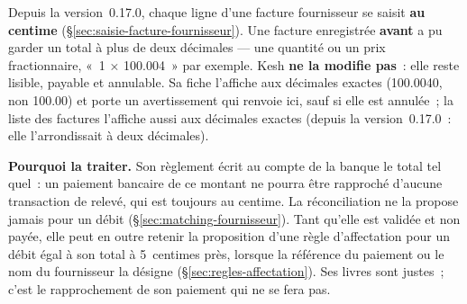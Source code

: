 \documentclass[a4paper,11pt,oneside]{article}
\begin{document}
Depuis la version~0.17.0, chaque ligne d'une facture fournisseur se saisit \textbf{au centime}
(\S\ref{sec:saisie-facture-fournisseur}). Une facture enregistrée \textbf{avant} a pu garder un
total à plus de deux décimales --- une quantité ou un prix fractionnaire, «~1 × 100.004~» par
exemple. Kesh \textbf{ne la modifie pas}~: elle reste lisible, payable et annulable. Sa fiche
l'affiche aux décimales exactes (100.0040, non 100.00) et porte un avertissement qui renvoie
ici, sauf si elle est annulée~; la liste des factures l'affiche aussi aux décimales exactes
(depuis la version~0.17.0~: elle l'arrondissait à deux décimales).

\textbf{Pourquoi la traiter.} Son règlement écrit au compte de la banque le total tel quel~:
un paiement bancaire de ce montant ne pourra être rapproché d'aucune transaction de relevé, qui
est toujours au centime. La réconciliation ne la propose jamais pour un débit
(\S\ref{sec:matching-fournisseur}). Tant qu'elle est validée et non payée, elle peut en outre retenir la
proposition d'une règle d'affectation pour un débit égal à son total à 5~centimes près, lorsque
la référence du paiement ou le nom du fournisseur la désigne (\S\ref{sec:regles-affectation}).
Ses livres sont justes~; c'est le rapprochement de son paiement qui ne se fera pas.
\end{document}
